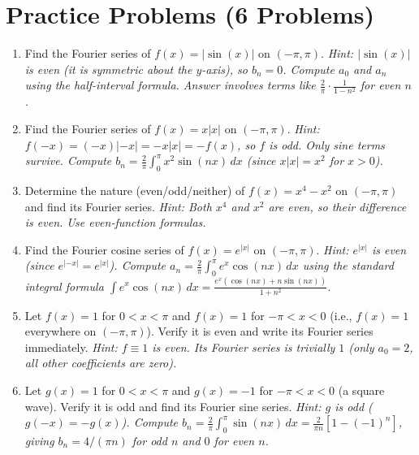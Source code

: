 \documentclass[12pt,a4paper]{article}
\begin{document}
\section{Practice Problems (6 Problems)}

\begin{enumerate}[label=\textbf{P\arabic*.}]

\item Find the Fourier series of $f(x) = |\sin(x)|$ on $(-\pi,\pi)$.
  \textit{Hint: $|\sin(x)|$ is even (it is symmetric about the $y$-axis), so $b_n = 0$.
  Compute $a_0$ and $a_n$ using the half-interval formula. Answer involves terms like
  $\frac{2}{\pi}\cdot\frac{1}{1-n^2}$ for even $n$.}

\item Find the Fourier series of $f(x) = x|x|$ on $(-\pi,\pi)$.
  \textit{Hint: $f(-x) = (-x)|-x| = -x|x| = -f(x)$, so $f$ is odd. Only sine terms survive.
  Compute $b_n = \frac{2}{\pi}\int_0^{\pi} x^2\sin(nx)\,dx$ (since $x|x| = x^2$ for $x>0$).}

\item Determine the nature (even/odd/neither) of $f(x) = x^4 - x^2$ on $(-\pi,\pi)$ and
  find its Fourier series.
  \textit{Hint: Both $x^4$ and $x^2$ are even, so their difference is even. Use even-function
  formulas.}

\item Find the Fourier cosine series of $f(x) = e^{|x|}$ on $(-\pi,\pi)$.
  \textit{Hint: $e^{|x|}$ is even (since $e^{|-x|} = e^{|x|}$). Compute
  $a_n = \frac{2}{\pi}\int_0^{\pi}e^x\cos(nx)\,dx$ using the standard integral formula
  $\int e^x\cos(nx)\,dx = \frac{e^x(\cos(nx)+n\sin(nx))}{1+n^2}$.}

\item Let $f(x) = 1$ for $0 < x < \pi$ and $f(x) = 1$ for $-\pi < x < 0$ (i.e., $f(x) = 1$
  everywhere on $(-\pi,\pi)$). Verify it is even and write its Fourier series immediately.
  \textit{Hint: $f \equiv 1$ is even. Its Fourier series is trivially $1$ (only $a_0 = 2$,
  all other coefficients are zero).}

\item Let $g(x) = 1$ for $0 < x < \pi$ and $g(x) = -1$ for $-\pi < x < 0$ (a square wave).
  Verify it is odd and find its Fourier sine series.
  \textit{Hint: $g$ is odd ($g(-x) = -g(x)$). Compute $b_n = \frac{2}{\pi}\int_0^{\pi}\sin(nx)\,dx
  = \frac{2}{\pi n}[1-(-1)^n]$, giving $b_n = 4/(\pi n)$ for odd $n$ and $0$ for even $n$.}

\end{enumerate}
\end{document}
